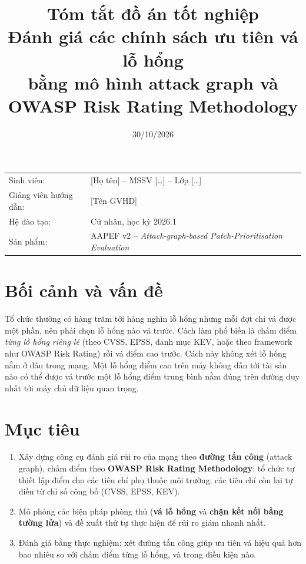 \documentclass[11pt,a4paper]{article}
\title{\textbf{Tóm tắt đồ án tốt nghiệp}\\[4pt]
\large Đánh giá các chính sách ưu tiên vá lỗ hổng\\ bằng mô hình attack graph và OWASP Risk Rating Methodology}
\author{}
\date{30/10/2026}
\begin{document}
\maketitle
\vspace{-1.4cm}

\begin{center}
\small
\begin{tabular}{@{}ll@{}}
Sinh viên: & [Họ tên] -- MSSV [\ldots] -- Lớp [\ldots] \\
Giảng viên hướng dẫn: & [Tên GVHD] \\
Hệ đào tạo: & Cử nhân, học kỳ 2026.1 \\
Sản phẩm: & AAPEF v2 -- \emph{Attack-graph-based Patch-Prioritisation Evaluation} \\
\end{tabular}
\end{center}

\section{Bối cảnh và vấn đề}

Tổ chức thường có hàng trăm tới hàng nghìn lỗ hổng nhưng mỗi đợt chỉ vá được một phần, nên phải chọn lỗ hổng nào vá trước. Cách làm phổ biến là chấm điểm \emph{từng lỗ hổng riêng lẻ} (theo CVSS, EPSS, danh mục KEV, hoặc theo framework như OWASP Risk Rating) rồi vá điểm cao trước. Cách này không xét lỗ hổng nằm ở đâu trong mạng. Một lỗ hổng điểm cao trên máy không dẫn tới tài sản nào có thể được vá trước một lỗ hổng điểm trung bình nằm đúng trên đường duy nhất tới máy chủ dữ liệu quan trọng.

\section{Mục tiêu}

\begin{enumerate}
  \item Xây dựng công cụ đánh giá rủi ro của mạng theo \textbf{đường tấn công} (attack graph), chấm điểm theo \textbf{OWASP Risk Rating Methodology}: tổ chức tự thiết lập điểm cho các tiêu chí phụ thuộc môi trường; các tiêu chí còn lại tự điền từ chỉ số công bố (CVSS, EPSS, KEV).
  \item Mô phỏng các biện pháp phòng thủ (\textbf{vá lỗ hổng} và \textbf{chặn kết nối bằng tường lửa}) và đề xuất thứ tự thực hiện để rủi ro giảm nhanh nhất.
  \item Đánh giá bằng thực nghiệm: xét đường tấn công giúp ưu tiên vá hiệu quả hơn bao nhiêu so với chấm điểm từng lỗ hổng, và trong điều kiện nào.
\end{enumerate}
\end{document}
